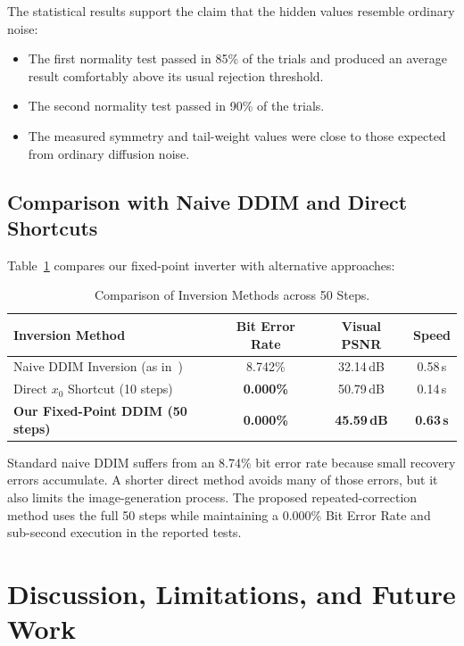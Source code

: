 \documentclass[conference]{IEEEtran}
\begin{document}
The statistical results support the claim that the hidden values resemble ordinary noise:
\begin{itemize}
    \item The first normality test passed in 85\% of the trials and produced an average result comfortably above its usual rejection threshold.
    \item The second normality test passed in 90\% of the trials.
    \item The measured symmetry and tail-weight values were close to those expected from ordinary diffusion noise.
\end{itemize}

\subsection{Comparison with Naive DDIM and Direct Shortcuts}
Table~\ref{tab:ablation_simple} compares our fixed-point inverter with alternative approaches:

\begin{table}[h]
\centering
\caption{Comparison of Inversion Methods across 50 Steps.}
\label{tab:ablation_simple}
\begin{tabular}{lccc}
\toprule
\textbf{Inversion Method} & \textbf{Bit Error Rate} & \textbf{Visual PSNR} & \textbf{Speed} \\
\midrule
Naive DDIM Inversion (as in~\cite{zhou2025improved}) & 8.742\% & 32.14\,dB & 0.58\,s \\
Direct $x_0$ Shortcut (10 steps) & \textbf{0.000\%} & 50.79\,dB & 0.14\,s \\
\textbf{Our Fixed-Point DDIM (50 steps)} & \textbf{0.000\%} & \textbf{45.59\,dB} & \textbf{0.63\,s} \\
\bottomrule
\end{tabular}
\end{table}

Standard naive DDIM suffers from an 8.74\% bit error rate because small recovery errors accumulate. A shorter direct method avoids many of those errors, but it also limits the image-generation process. The proposed repeated-correction method uses the full 50 steps while maintaining a 0.000\% Bit Error Rate and sub-second execution in the reported tests.

\section{Discussion, Limitations, and Future Work}
\end{document}
